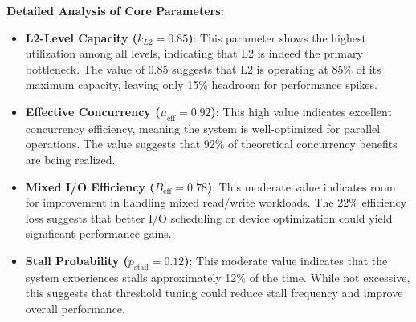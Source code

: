 \documentclass[11pt]{article}
\begin{document}
\textbf{Detailed Analysis of Core Parameters:}
\begin{itemize}
    \item \textbf{L2-Level Capacity ($k_{L2} = 0.85$)}: This parameter shows the highest utilization among all levels, indicating that L2 is indeed the primary bottleneck. The value of 0.85 suggests that L2 is operating at 85\% of its maximum capacity, leaving only 15\% headroom for performance spikes.
    \item \textbf{Effective Concurrency ($\mu_{\text{eff}} = 0.92$)}: This high value indicates excellent concurrency efficiency, meaning the system is well-optimized for parallel operations. The value suggests that 92\% of theoretical concurrency benefits are being realized.
    \item \textbf{Mixed I/O Efficiency ($B_{\text{eff}} = 0.78$)}: This moderate value indicates room for improvement in handling mixed read/write workloads. The 22\% efficiency loss suggests that better I/O scheduling or device optimization could yield significant performance gains.
    \item \textbf{Stall Probability ($p_{\text{stall}} = 0.12$)}: This moderate value indicates that the system experiences stalls approximately 12\% of the time. While not excessive, this suggests that threshold tuning could reduce stall frequency and improve overall performance.
\end{itemize}
\end{document}
